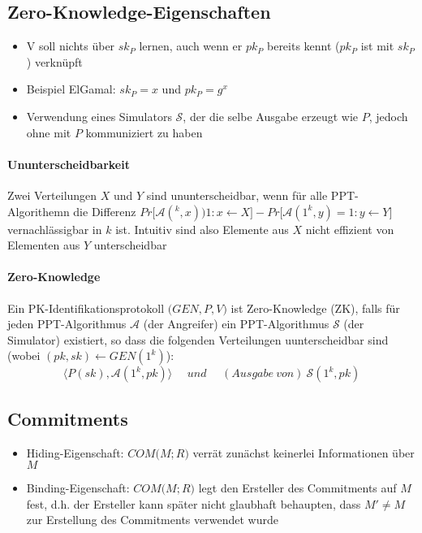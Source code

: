 \subsection{Zero-Knowledge-Eigenschaften}
\begin{itemize}
	\item V soll nichts über \(sk_P\) lernen, auch wenn er \(pk_P\) bereits kennt (\(pk_P\) ist mit \(sk_P\)) verknüpft
	\item Beispiel ElGamal: \(sk_P = x\) und \(pk_P = g^x\)
	\item Verwendung eines Simulators \(\mathcal{S}\), der die selbe Ausgabe erzeugt wie \(P\), jedoch ohne mit \(P\) kommuniziert zu haben
\end{itemize}

\paragraph{Ununterscheidbarkeit} Zwei Verteilungen \(X\) und \(Y\) sind ununterscheidbar, wenn für alle PPT-Algorithemn die Differenz \(Pr\big\lbrack\mathcal{A}(^k,x) ) 1 : x\leftarrow X\big\rbrack - Pr\big\lbrack\mathcal{A}(1^k,y) = 1 : y\leftarrow Y\big\rbrack\) vernachlässigbar in \(k\) ist. Intuitiv sind also Elemente aus \(X\) nicht effizient von Elementen aus \(Y\) unterscheidbar

\paragraph{Zero-Knowledge} Ein PK-Identifikationsprotokoll \(\big(GEN,P,V\big)\) ist Zero-Knowledge (ZK), falls für jeden PPT-Algorithmus \(\mathcal{A}\) (der Angreifer) ein PPT-Algorithmus \(\mathcal{S}\) (der Simulator) existiert, so dass die folgenden Verteilungen uunterscheidbar sind (wobei \((pk,sk) \leftarrow GEN(1^k)\)):
\[\langle P(sk),\mathcal{A}(1^k,pk)\rangle~~~~~~und~~~~~~(Ausgabe~von)~\mathcal{S}(1^k,pk)\]


\subsection{Commitments}
\begin{itemize}
	\item Hiding-Eigenschaft: \(COM\big(M;R\big)\) verrät zunächst keinerlei Informationen über \(M\)
	\item Binding-Eigenschaft: \(COM\big(M;R\big)\) legt den Ersteller des Commitments auf \(M\) fest, d.h. der Ersteller kann später nicht glaubhaft behaupten, dass \(M' \neq M\) zur Erstellung des Commitments verwendet wurde
\end{itemize}



